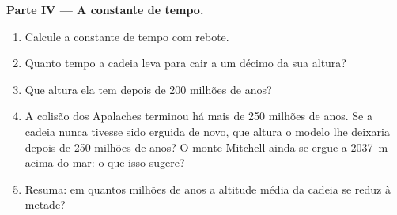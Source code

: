 \begin{problem}
\medskip
\noindent\textbf{Parte IV --- A constante de tempo.}
\begin{enumerate}[resume]
  \item Calcule a constante de tempo com rebote.
  \item Quanto tempo a cadeia leva para cair a um décimo da sua altura?
  \item Que altura ela tem depois de 200 milhões de anos?
  \item A colisão dos Apalaches terminou há mais de 250 milhões de anos. Se
        a cadeia nunca tivesse sido erguida de novo, que altura o modelo lhe
        deixaria depois de 250 milhões de anos? O monte Mitchell ainda se
        ergue a \qty{2037}{m} acima do mar: o que isso sugere?
  \item Resuma: em quantos milhões de anos a altitude média da cadeia se
        reduz à metade?
\end{enumerate}
\end{problem}
